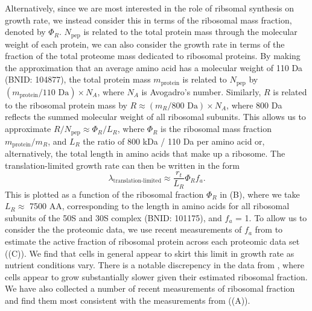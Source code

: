 Alternatively, since we are most interested in the role of ribsomal synthesis on
growth rate, we instead consider this in terms of the ribosomal mass fraction, denoted by $\Phi_R$. $N_\text{pep}$ is related to the total protein mass
through the molecular weight of each protein, we can also consider the growth
rate in terms of the fraction of the total proteome mass dedicated to ribosomal
proteins. By making the approximation that an average amino acid has a molecular
weight of 110 Da (BNID: 104877), the total protein mass $m_\text{protein}$ is
related to $N_\text{pep}$ by $(m_\text{protein}/\text{110 Da}) \times N_A$,
where $N_A$ is Avogadro's number. Similarly, $R$ is related to the ribosomal
protein mass by $R \approx (m_R/\text{800 Da}) \times N_A$, where 800 Da
reflects the summed molecular weight of all ribosomal subunits.  This allows us
to approximate  $R / N_\text{pep} \approx \Phi_R / L_R$,  where $\Phi_R$ is the
ribosomal mass fraction $m_\text{protein}/m_R$, and $L_R$ the ratio of 800 kDa /
110 Da per amino acid or, alternatively, the total length in amino acids that
make up a ribosome. The translation-limited growth rate can then be written in
the form
\begin{equation}
\lambda_{\textrm{translation-limited}} \approx \frac{r_t}{L_R}  \Phi_R f_a.
\label{eq:translation_limit_growth_rate}
\end{equation}
This is plotted as a function of the ribosomal fraction $\Phi_R$ in
(B), where we take $L_R \approx$ 7500 AA, corresponding to
the length in amino acids for all ribosomal subunits of the 50S and 30S complex
(BNID: 101175), and $f_a$ = 1. To allow us to consider the the proteomic data,
we use recent measurements of $f_a$ from \cite{dai2016} to estimate the active
fraction of ribosomal protein across each proteomic data set
((C)). We find that cells in general appear to
skirt this limit in growth rate as nutrient conditions vary. There is a notable discrepency
in the data from \cite{peebo2015, valgepea2013}, where cells appear to grow
substantially slower given their estimated ribosomal fraction. We have
also collected a number of recent measurements of ribosomal fraction and
find them most consistent with the measurements from \cite{li2014,
schmidt2016} ((A)).

